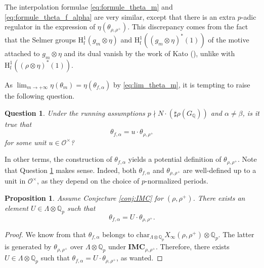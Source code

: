 \documentclass[12pt]{amsart}
\newcommand\bQ{\mathbb{Q}}
\newcommand\Qp{{\mathbb{Q}_p}}
\newcommand\cO{\mathcal{O}}
\renewcommand{\char}{\textrm{char}}
\newcommand{\HH}{\mathrm{H}}
\newcommand{\ff}{\mathrm{f}}
\theoremstyle{defstyle}
\theoremstyle{thmstyle}
\newtheorem{proposition}[subsubsection]{Proposition}
\newtheorem{question}[subsubsection]{Question}
\begin{document}
 The interpolation formulae \eqref{eq:formule_theta_m} and \eqref{eq:formule_theta_f_alpha} are very similar, except that there is an extra $p$-adic regulator in the expression of $\eta(\theta_{\rho,\rho^+})$. This discrepancy comes from the fact that the Selmer groups $\HH^1_\ff(g_m\otimes \eta)$ and  $\HH^1_\ff((g_m\otimes \eta)^*(1))$ of the motive attached to $g_m\otimes \eta$ and its dual vanish by the work of Kato (\cite[Thm. 14.2 (1)]{kato2004p}), unlike with $\HH^1_\ff((\rho\otimes \eta)^*(1))$. 
 
As $\lim_{m\to +\infty} \eta(\theta_m)=\eta(\theta_{f,\alpha})$ by \eqref{eq:lim_theta_m}, it is tempting to raise the following question.

\begin{question}\label{question}
	Under the running assumptions $p\nmid N\cdot(\sharp \rho(G_{\bQ}))$ and $\alpha\neq \beta$, is it true that 
	\begin{equation}\label{eq:question}
		\theta_{f,\alpha}=u\cdot \theta_{\rho,\rho^+}
	\end{equation}
	for some unit $u\in \cO^\times$?
\end{question}
In other terms, the construction of $\theta_{f,\alpha}$ yields a potential definition of $\theta_{\rho,\rho^+}$. Note that Question \ref{question} makes sense. Indeed, both $\theta_{f,\alpha}$ and $\theta_{\rho,\rho^+}$ are well-defined up to a unit in $\cO^\times$, as they depend on the choice of $p$-normalized periods.

\begin{proposition}
	Assume Conjecture \ref{conj:IMC} for $(\rho,\rho^+)$. There exists an element $U \in \Lambda \otimes \Qp$ such that 
	\[\theta_{f,\alpha}=U\cdot \theta_{\rho,\rho^+}.\]
\end{proposition}
\begin{proof}
	We know from \cite[Thm. C]{maks} that $\theta_{f,\alpha}$ belongs to $\char_{\Lambda\otimes \Qp} X_\infty(\rho,\rho^+) \otimes \Qp$. The latter is generated by $\theta_{\rho,\rho^+}$ over $\Lambda \otimes \Qp$ under \textbf{IMC}$_{\rho,\rho^+}$. Therefore, there exists $U \in \Lambda \otimes \Qp$ such that \(\theta_{f,\alpha}=U\cdot \theta_{\rho,\rho^+}\), as wanted.
\end{proof}
\end{document}
